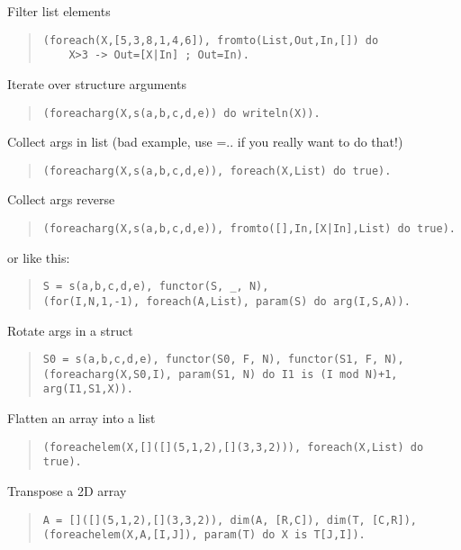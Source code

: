 Filter list elements
\begin{quote}\begin{verbatim}
(foreach(X,[5,3,8,1,4,6]), fromto(List,Out,In,[]) do
    X>3 -> Out=[X|In] ; Out=In).
\end{verbatim}\end{quote}

Iterate over structure arguments
\begin{quote}\begin{verbatim}
(foreacharg(X,s(a,b,c,d,e)) do writeln(X)).
\end{verbatim}\end{quote}

Collect args in list
(bad example, use =.. if you really want to do that!)
\begin{quote}\begin{verbatim}
(foreacharg(X,s(a,b,c,d,e)), foreach(X,List) do true).
\end{verbatim}\end{quote}

Collect args reverse
\begin{quote}\begin{verbatim}
(foreacharg(X,s(a,b,c,d,e)), fromto([],In,[X|In],List) do true).
\end{verbatim}\end{quote}

or like this:
\begin{quote}\begin{verbatim}
S = s(a,b,c,d,e), functor(S, _, N),
(for(I,N,1,-1), foreach(A,List), param(S) do arg(I,S,A)).
\end{verbatim}\end{quote}

Rotate args in a struct
\begin{quote}\begin{verbatim}
S0 = s(a,b,c,d,e), functor(S0, F, N), functor(S1, F, N),
(foreacharg(X,S0,I), param(S1, N) do I1 is (I mod N)+1, arg(I1,S1,X)).
\end{verbatim}\end{quote}

Flatten an array into a list
\begin{quote}\begin{verbatim}
(foreachelem(X,[]([](5,1,2),[](3,3,2))), foreach(X,List) do true).
\end{verbatim}\end{quote}

Transpose a 2D array
\begin{quote}\begin{verbatim}
A = []([](5,1,2),[](3,3,2)), dim(A, [R,C]), dim(T, [C,R]),
(foreachelem(X,A,[I,J]), param(T) do X is T[J,I]).
\end{verbatim}\end{quote}

